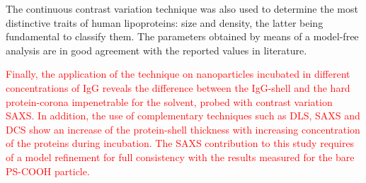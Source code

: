 The continuous contrast variation technique was also used to determine the most distinctive traits of human lipoproteins: size and density, the latter being fundamental to classify them. The parameters obtained by means of a model-free analysis are in good agreement with the reported values in literature.

\textcolor{red}{Finally, the application of the technique on nanoparticles incubated in different concentrations of IgG reveals the difference between the IgG-shell and the hard protein-corona impenetrable for the solvent, probed with contrast variation SAXS. In addition, the use of complementary techniques such as DLS, SAXS and DCS show an increase of the protein-shell thickness with increasing concentration of the proteins during incubation. The SAXS contribution to this study requires of a model refinement for full consistency with the results measured for the bare PS-COOH particle.}
